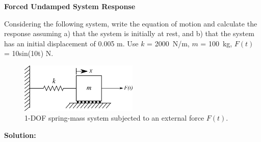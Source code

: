 \documentclass[12pt,letter]{article}
\begin{document}
\begin{example}
	\textbf{Forced Undamped System Response}

	\noindent Considering the following system, write the equation of motion and calculate the response assuming a) that the system is initially at rest, and b) that the system has an initial displacement of 0.005 m. Use $k$ = 2000~N/m, $m$ = 100~kg, $F(t)$ = 10sin(10t) N.
	\begin{figure}[H]
		\centering
		\includegraphics[width=0.5\textwidth]{../figures/1-DOF-spring_mass_horizontal_forced.png}
		\caption{1-DOF spring-mass system subjected to an external force $F(t)$.}
	\end{figure}
	\noindent\textbf{Solution:} 


\end{example}
\end{document}
